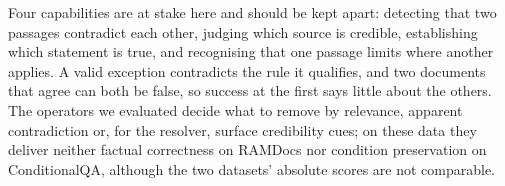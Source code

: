 Four capabilities are at stake here and should be kept apart: detecting that two passages contradict each other, judging which source is credible, establishing which statement is true, and recognising that one passage limits where another applies. A valid exception contradicts the rule it qualifies, and two documents that agree can both be false, so success at the first says little about the others. The operators we evaluated decide what to remove by relevance, apparent contradiction or, for the resolver, surface credibility cues; on these data they deliver neither factual correctness on RAMDocs nor condition preservation on ConditionalQA, although the two datasets' absolute scores are not comparable.


